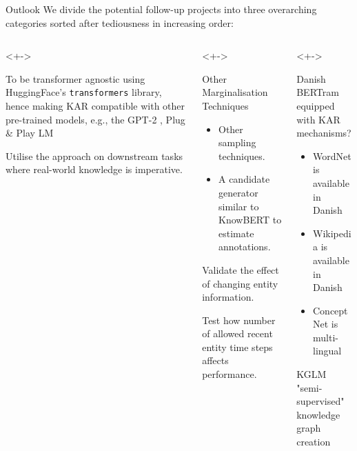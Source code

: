 \begin{frame}{Outlook}
\footnotesize
We divide the potential follow-up projects into three overarching categories sorted after tediousness in increasing order:
\begin{columns}
\begin{column}[T]{0.333\textwidth}<+->
\begin{itemize}
{\footnotesize
    \item  To be transformer agnostic using HuggingFace's \texttt{transformers} library, hence making KAR compatible with other pre-trained models, e.g., the GPT-2 \cite{radford2019language}, Plug \& Play LM \cite{Dathathri2019PlugGeneration}
    \item Utilise the approach on downstream tasks where real-world knowledge is imperative.
}
\end{itemize}

\end{column}
\begin{column}[T]{0.333\textwidth}<+->
\begin{itemize}
{\footnotesize
    \item Other Marginalisation Techniques
    \begin{itemize}
        \item Other sampling techniques.
        \item A candidate generator similar to KnowBERT to estimate annotations.
    \end{itemize}
    \item Validate the effect of changing entity information.
    \item Test how number of allowed recent entity time steps affects performance.
}
\end{itemize}

\end{column}
\begin{column}[T]{0.333\textwidth}<+->
\begin{itemize}
{\footnotesize
    \item Danish BERTram equipped with KAR mechanisms?
    \begin{itemize}
        \item WordNet is available in Danish \Smiley{} 
        \item Wikipedia is available in Danish \Smiley{}
        \item ConceptNet is multi-lingual \Smiley{}
    \end{itemize}
    \item KGLM "semi-supervised" knowledge graph creation
}
\end{itemize}
\end{column}
\end{columns}
\end{frame}



